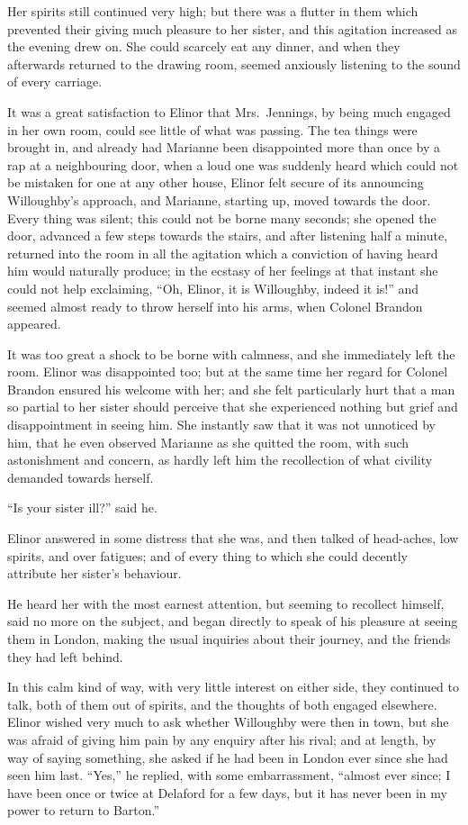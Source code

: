 \documentclass{article}
\begin{document}
Her spirits still continued very high; but there
was a flutter in them which prevented their giving much
pleasure to her sister, and this agitation increased as
the evening drew on.  She could scarcely eat any dinner,
and when they afterwards returned to the drawing room,
seemed anxiously listening to the sound of every carriage.

It was a great satisfaction to Elinor that Mrs.\ Jennings,
by being much engaged in her own room, could see little
of what was passing.  The tea things were brought in,
and already had Marianne been disappointed more than once
by a rap at a neighbouring door, when a loud one was suddenly
heard which could not be mistaken for one at any other house,
Elinor felt secure of its announcing Willoughby's approach,
and Marianne, starting up, moved towards the door.
Every thing was silent; this could not be borne many seconds;
she opened the door, advanced a few steps towards the stairs,
and after listening half a minute, returned into the room
in all the agitation which a conviction of having heard
him would naturally produce; in the ecstasy of her
feelings at that instant she could not help exclaiming,
``Oh, Elinor, it is Willoughby, indeed it is!'' and seemed
almost ready to throw herself into his arms, when Colonel
Brandon appeared.

It was too great a shock to be borne with calmness,
and she immediately left the room.  Elinor was disappointed too;
but at the same time her regard for Colonel Brandon ensured
his welcome with her; and she felt particularly hurt that
a man so partial to her sister should perceive that she
experienced nothing but grief and disappointment in seeing him.
She instantly saw that it was not unnoticed by him,
that he even observed Marianne as she quitted the room,
with such astonishment and concern, as hardly left him
the recollection of what civility demanded towards herself.

``Is your sister ill?'' said he.

Elinor answered in some distress that she was,
and then talked of head-aches, low spirits, and over fatigues;
and of every thing to which she could decently attribute
her sister's behaviour.

He heard her with the most earnest attention,
but seeming to recollect himself, said no more on the subject,
and began directly to speak of his pleasure at seeing them
in London, making the usual inquiries about their journey,
and the friends they had left behind.

In this calm kind of way, with very little interest
on either side, they continued to talk, both of them out
of spirits, and the thoughts of both engaged elsewhere.
Elinor wished very much to ask whether Willoughby were
then in town, but she was afraid of giving him pain
by any enquiry after his rival; and at length, by way
of saying something, she asked if he had been in London
ever since she had seen him last.  ``Yes,'' he replied,
with some embarrassment, ``almost ever since; I have been
once or twice at Delaford for a few days, but it has never
been in my power to return to Barton.''
\end{document}
